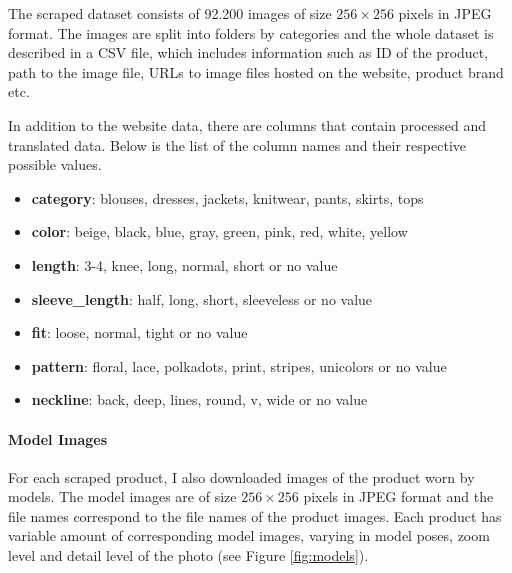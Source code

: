 \documentclass[12pt]{report}
\begin{document}
The scraped dataset consists of 92.200 images of size $256\times256$ pixels in JPEG format. The images are split into folders by categories and the whole dataset is described in a CSV file, which includes information such as ID of the product,  path to the image file, URLs to image files hosted on the website, product brand etc.

In addition to the website data, there are columns that contain processed and translated data. Below is the list of the column names and their respective possible values.
\begin{itemize}
\item \textbf{category}: blouses, dresses, jackets, knitwear, pants, skirts, tops
\item \textbf{color}: beige, black, blue, gray, green, pink, red, white, yellow
\item \textbf{length}: 3-4, knee, long, normal, short or no value
\item \textbf{sleeve\_length}: half, long, short, sleeveless or no value
\item \textbf{fit}: loose, normal, tight or no value
\item \textbf{pattern}: floral, lace, polkadots, print, stripes, unicolors or no value
\item \textbf{neckline}: back, deep, lines, round, v, wide or no value
\end{itemize}

\pagebreak
\paragraph{Model Images}
For each scraped product, I also downloaded images of the product worn by models. The model images are of size $256\times256$ pixels in JPEG format and the file names correspond to the file names of the product images. Each product has variable amount of corresponding model images, varying in model poses, zoom level and detail level of the photo (see Figure \ref{fig:models}).
\end{document}
